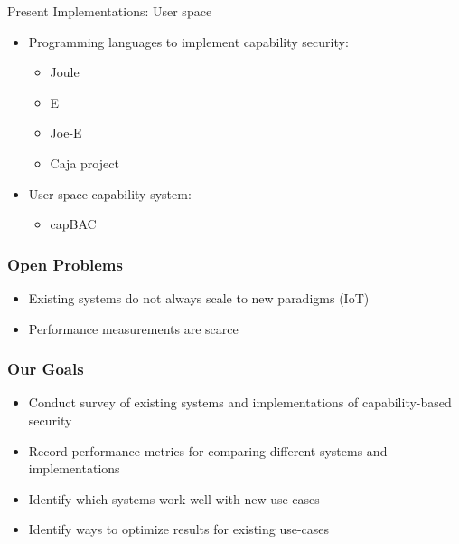 \documentclass[xcolor=table]{beamer}
\begin{document}
\begin{frame}{Present Implementations: User space}
\begin{itemize}
    \item Programming languages to implement capability security:
    \begin{itemize}
        \item Joule
        \item E
        \item Joe-E
        \item Caja project
    \end{itemize}

    \item User space capability system:
    \begin{itemize}
        \item capBAC
    \end{itemize}
\end{itemize}

\end{frame}

\begin{frame}
  \frametitle{Open Problems}
    \begin{itemize}
        \item Existing systems do not always scale to new paradigms (IoT)
        \item Performance measurements are scarce 
    \end{itemize}
 
\end{frame}

\begin{frame}
  \frametitle{Our Goals}
   \begin{itemize}
      \item Conduct survey of existing systems and implementations of capability-based security
      \item Record performance metrics for comparing different systems and implementations
      \item Identify which systems work well with new use-cases
      \item Identify ways to optimize results for existing use-cases
      
      
  \end{itemize}
\end{frame}
\end{document}

